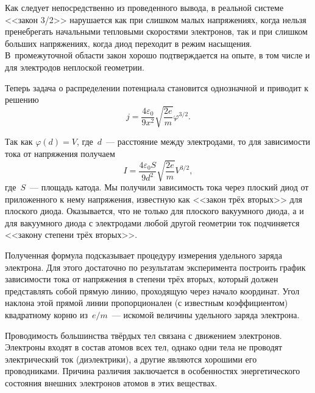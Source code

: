 Как следует непосредственно из проведенного вывода,
в реальной системе <<закон 3/2>> нарушается как при слишком малых напряжениях,
когда нельзя пренебрегать начальными тепловыми скоростями электронов,
так и при слишком больших напряжениях, когда диод переходит в режим насыщения.
В~промежуточной области закон хорошо подтверждается на опыте, в том числе
и для электродов неплоской геометрии.
\todo[inline,color=green]{<---}

Теперь задача о распределении потенциала становится однозначной и приводит к
решению
\begin{equation*}
	j=\frac{4\varepsilon_0}{9x^2}\sqrt{\frac{2e}{m}}\varphi^{3/2}.
\end{equation*}

Так как $\varphi(d)=V$, где~$d$~--- расстояние между электродами, то для
зависимости тока от напряжения получаем
\begin{equation*}
	I=\frac{4\varepsilon_0 S}{9d^2}\sqrt{\frac{2e}{m}}V^{3/2},
\end{equation*}
где~$S$~--- площадь катода. Мы получили зависимость тока через плоский диод от
приложенного к нему напряжения, известную как <<закон трёх вторых>> для плоского
диода. Оказывается, что не только для плоского вакуумного диода, а и для
вакуумного диода с электродами любой другой геометрии ток подчиняется <<закону
степени трёх вторых>>.

Полученная формула подсказывает процедуру измерения удельного заряда электрона.
Для этого достаточно по
результатам эксперимента построить график зависимости тока от напряжения в
степени трёх вторых, который должен
представлять собой прямую линию, проходящую через начало координат. Угол наклона
этой прямой линии пропорционален (с известным коэффициентом) квадратному корню
из~$e/m$~--- искомой величины удельного заряда электрона.
\todo[inline,color=cyan]{<---}


Проводимость большинства твёрдых тел связана с движением электронов. Электроны
входят в состав атомов всех тел, однако одни тела не проводят электрический ток
(диэлектрики), а другие являются хорошими его проводниками. Причина различия
заключается в особенностях энергетического состояния внешних электронов атомов в
этих веществах.

